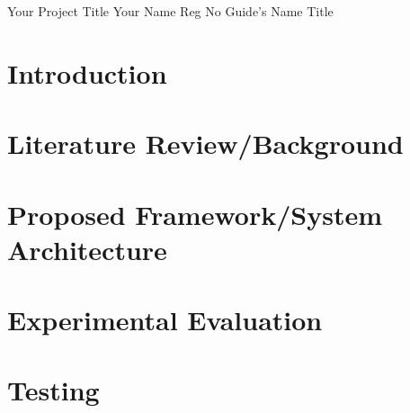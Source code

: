 \documentclass{vitmsprojectreport}
\begin{document}

\maketitlepage%
{Your Project Title}%
{Your Name}%
{Reg No}%
{Guide's Name}%
{Title}%

\makedeclarationpage%

\makebonafidepage%

\makeackpage%

\makeexecsummarypage%

\tableofcontents  %
\clearpage
\listoffigures    %
\clearpage
\listoftables     %
\clearpage

\setcounter{page}{1}


\chapter{Introduction}

\chapter{Literature Review/Background}

\chapter{Proposed Framework/System Architecture}

\chapter{Experimental Evaluation}

\chapter{Testing}
\end{document}
